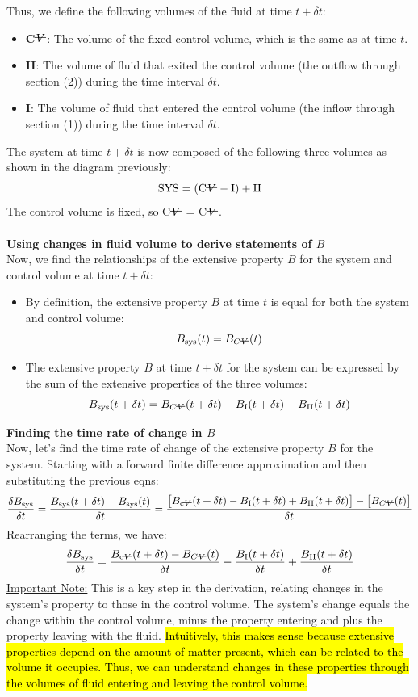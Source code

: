 ﻿\documentclass[12pt]{article}
\newcommand{\vol}{\mathord{\text{\ooalign{\hidewidth $V$\hidewidth\cr\kern-0.5pt\raisebox{0.8ex}{\rule[0pt]{1em}{0.5pt}}}}}}
\begin{document}
Thus, we define the following volumes of the fluid at time $t+\delta t$:
\begin{itemize}
    \item \textbf{C$\vol$}: The volume of the fixed control volume, which is the same as at time $t$.
    \item \textbf{II}: The volume of fluid that exited the control volume (the outflow through section (2)) during the time interval $\delta t$.
    \item \textbf{I}: The volume of fluid that entered the control volume (the inflow through section (1)) during the time interval $\delta t$.
\end{itemize}
The system at time $t+\delta t$ is now composed of the following three volumes as shown in the diagram previously:
\[\text{SYS} = (\text{C$\vol$} - \text{I}) +\text{II}\]
The control volume is fixed, so C$\vol$ = C$\vol$.\\\\
\textbf{Using changes in fluid volume to derive statements of $B$}\\
Now, we find the relationships of the extensive property $B$ for the system and control volume at time $t+\delta t$:
\begin{itemize}
    \item By definition, the extensive property $B$ at time $t$ is equal for both the system and control volume:
    \[B_{\text{sys}}(t) = B_{C\vol}(t)\]
    \item The extensive property $B$ at time $t+\delta t$ for the system can be expressed by the sum of the extensive properties of the three volumes:
    \[B_{\text{sys}}(t+\delta t) = B_{C\vol}(t+\delta t) - B_{\text{I}}(t+\delta t) + B_{\text{II}}(t+\delta t)\]
\end{itemize}
\textbf{Finding the time rate of change in $B$}\\
Now, let's find the time rate of change of the extensive property $B$ for the system. Starting with a forward finite difference approximation and then substituting the previous eqns:
\[
\frac{\delta B_{\mathrm{sys}}}{\delta t}
= \frac{B_{\mathrm{sys}}(t+\delta t)-B_{\mathrm{sys}}(t)}{\delta t}
= \frac{\big[B_{\mathrm{c\vol}}(t+\delta t)-B_{\mathrm{I}}(t+\delta t)+B_{\mathrm{II}}(t+\delta t)\big]-\big[B_{C\vol}(t)\big]}{\delta t}
\]
Rearranging the terms, we have:
\[\frac{\delta B_{\mathrm{sys}}}{\delta t} = \frac{B_{\mathrm{c\vol}}(t+\delta t)-B_{C\vol}(t)}{\delta t} - \frac{B_{\mathrm{I}}(t+\delta t)}{\delta t} + \frac{B_{\mathrm{II}}(t+\delta t)}{\delta t}\]
\underline{Important Note:} This is a key step in the derivation, relating changes in the system's property to those in the control volume. The system's change equals the change within the control volume, minus the property entering and plus the property leaving with the fluid.\hl{ Intuitively, this makes sense because extensive properties depend on the amount of matter present, which can be related to the volume it occupies. Thus, we can understand changes in these properties through the volumes of fluid entering and leaving the control volume.}
\end{document}
